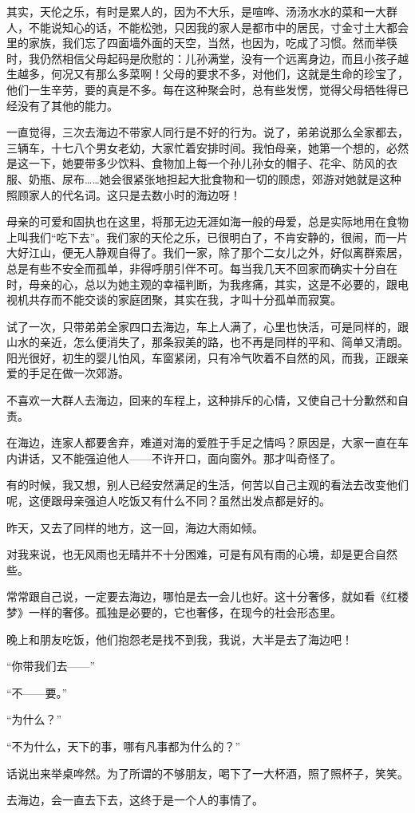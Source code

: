 \par 其实，天伦之乐，有时是累人的，因为不大乐，是喧哗、汤汤水水的菜和一大群人，不能说知心的话，不能松弛，只因我的家人是都市中的居民，寸金寸土大都会里的家族，我们忘了四面墙外面的天空，当然，也因为，吃成了习惯。然而举筷时，我仍然相信父母起码是欣慰的：儿孙满堂，没有一个远离身边，而且小孩子越生越多，何况又有那么多菜啊！父母的要求不多，对他们，这就是生命的珍宝了，他们一生辛劳，要的真是不多。每在这种聚会时，总有些发愣，觉得父母牺牲得已经没有了其他的能力。
\par 一直觉得，三次去海边不带家人同行是不好的行为。说了，弟弟说那么全家都去，三辆车，十七八个男女老幼，大家忙着安排时间。我怕母亲，她第一个想的，必然是这一下，她要带多少饮料、食物加上每一个孙儿孙女的帽子、花伞、防风的衣服、奶瓶、尿布……她会很紧张地担起大批食物和一切的顾虑，郊游对她就是这种照顾家人的代名词。这只是去数小时的海边呀！
\par 母亲的可爱和固执也在这里，将那无边无涯如海一般的母爱，总是实际地用在食物上叫我们“吃下去”。我们家的天伦之乐，已很明白了，不肯安静的，很闹，而一片大好江山，便无人静观自得了。我们一家，除了那个二女儿之外，好似离群索居，总是有些不安全而孤单，非得呼朋引伴不可。每当我几天不回家而确实十分自在时，母亲的心，总以为她主观的幸福判断，为我疼痛，其实，这是不必要的，跟电视机共存而不能交谈的家庭团聚，其实在我，才叫十分孤单而寂寞。
\par 试了一次，只带弟弟全家四口去海边，车上人满了，心里也快活，可是同样的，跟山水的亲近，怎么便消失了，那条寂美的路，也不再是同样的平和、简单又清朗。阳光很好，初生的婴儿怕风，车窗紧闭，只有冷气吹着不自然的风，而我，正跟亲爱的手足在做一次郊游。
\par 不喜欢一大群人去海边，回来的车程上，这种排斥的心情，又使自己十分歉然和自责。
\par 在海边，连家人都要舍弃，难道对海的爱胜于手足之情吗？原因是，大家一直在车内讲话，又不能强迫他人——不许开口，面向窗外。那才叫奇怪了。
\par 有的时候，我又想，别人已经安然满足的生活，何苦以自己主观的看法去改变他们呢，这便跟母亲强迫人吃饭又有什么不同？虽然出发点都是好的。
\par 昨天，又去了同样的地方，这一回，海边大雨如倾。
\par 对我来说，也无风雨也无晴并不十分困难，可是有风有雨的心境，却是更合自然些。
\par 常常跟自己说，一定要去海边，哪怕是去一会儿也好。这十分奢侈，就如看《红楼梦》一样的奢侈。孤独是必要的，它也奢侈，在现今的社会形态里。
\par 晚上和朋友吃饭，他们抱怨老是找不到我，我说，大半是去了海边吧！
\par “你带我们去——”
\par “不——要。”
\par “为什么？”
\par “不为什么，天下的事，哪有凡事都为什么的？”
\par 话说出来举桌哗然。为了所谓的不够朋友，喝下了一大杯酒，照了照杯子，笑笑。
\par 去海边，会一直去下去，这终于是一个人的事情了。


